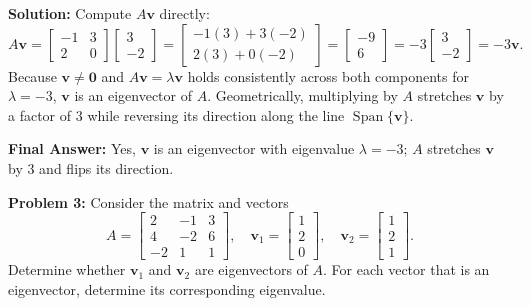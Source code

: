\documentclass[11pt, letterpaper]{article}
\theoremstyle{definition}
\theoremstyle{remark}
\begin{document}
\textbf{Solution:}
Compute $A\mathbf{v}$ directly:
\[
A\mathbf{v} = \begin{bmatrix} -1 & 3 \\ 2 & 0 \end{bmatrix}\begin{bmatrix} 3 \\ -2 \end{bmatrix} = \begin{bmatrix} -1(3) + 3(-2) \\ 2(3) + 0(-2) \end{bmatrix} = \begin{bmatrix} -9 \\ 6 \end{bmatrix} = -3\begin{bmatrix} 3 \\ -2 \end{bmatrix} = -3\mathbf{v}.
\]
Because $\mathbf{v} \neq \mathbf{0}$ and $A\mathbf{v} = \lambda\mathbf{v}$ holds consistently across both components for $\lambda = -3$, $\mathbf{v}$ is an eigenvector of $A$. Geometrically, multiplying by $A$ stretches $\mathbf{v}$ by a factor of $3$ while reversing its direction along the line $\operatorname{Span}\{\mathbf{v}\}$.

\textbf{Final Answer:} Yes, $\mathbf{v}$ is an eigenvector with eigenvalue $\lambda = -3$; $A$ stretches $\mathbf{v}$ by $3$ and flips its direction.

\vspace{0.4em}
\textbf{Problem 3:}
Consider the matrix and vectors
\[
A = \begin{bmatrix} 2 & -1 & 3 \\ 4 & -2 & 6 \\ -2 & 1 & 1 \end{bmatrix}, \quad \mathbf{v}_1 = \begin{bmatrix} 1 \\ 2 \\ 0 \end{bmatrix}, \quad \mathbf{v}_2 = \begin{bmatrix} 1 \\ 2 \\ 1 \end{bmatrix}.
\]
Determine whether $\mathbf{v}_1$ and $\mathbf{v}_2$ are eigenvectors of $A$. For each vector that is an eigenvector, determine its corresponding eigenvalue.
\end{document}

